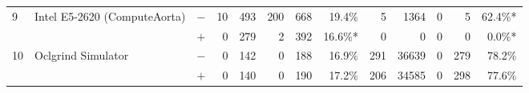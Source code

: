 \begin{tabular}{lll | rrrrr | rrrrr }
\hline
\multirow{ 2}{*}{9} & \multirow{ 2}{*}{Intel E5-2620 (ComputeAorta)} & $-$ & 10 & 493 & 200 & 668 & 19.4\%       & 5 & 1364 & 0 & 5 & 62.4\%* \\& & $+$ & 0 & 279 & 2 & 392 & 16.6\%* & 0 & 0 & 0 & 0 & 0.0\%* \\
\hline
\multirow{ 2}{*}{10} & \multirow{ 2}{*}{Oclgrind Simulator} & $-$ & 0 & 142 & 0 & 188 & 16.9\%       & 291 & 36639 & 0 & 279 & 78.2\% \\& & $+$ & 0 & 140 & 0 & 190 & 17.2\% & 206 & 34585 & 0 & 298 & 77.6\% \\
  \bottomrule
\end{tabular}

